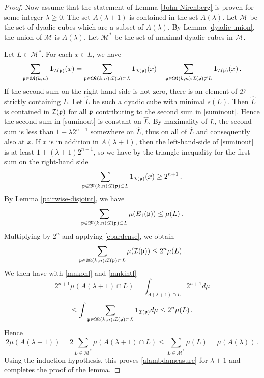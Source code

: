 {\begin{proof}
Now assume that the statement of Lemma \ref{John-Nirenberg}
is proven for some integer $\lambda\ge 0$.
The set $A(\lambda+1)$ is contained in the set $A(\lambda)$.
Let  $\mathcal{M}$ be the set of dyadic cubes which are a subset of $A(\lambda)$. By Lemma \ref{dyadic-union}, the union of $\mathcal{M}$ is $A(\lambda)$.
Let $\mathcal{M}^*$ be the set of maximal dyadic cubes in $\mathcal{M}$.

Let $L\in \mathcal{M}^*$. For each $x\in L$, we have
\begin{equation}\label{suminout}
 \sum_{{\mathfrak p} \in {\mathfrak{M}}(k,n)} \mathbf{1}_{{\mathcal{I}}({\mathfrak p})}(x)=
   \sum_{{\mathfrak p} \in {\mathfrak{M}}(k,n):{\mathcal{I}}({\mathfrak p}) \subset L} \mathbf{1}_{{\mathcal{I}}({\mathfrak p})}(x)+
  \sum_{{\mathfrak p} \in {\mathfrak{M}}(k,n):{\mathcal{I}}({\mathfrak p}) \not \subset L} \mathbf{1}_{{\mathcal{I}}({\mathfrak p})}(x)\, .
\end{equation}
If the second sum on the right-hand-side is not zero, there is
an element of $\mathcal{D}$  strictly containing $L$.
Let $\hat{L}$ be such a dyadic cube with minimal $s(L)$. Then $\hat{L}$ is contained in ${\mathcal{I}}({\mathfrak p})$ for all ${\mathfrak p}$
contributing to the second sum in
\eqref{suminout}.
Hence the second sum in \eqref{suminout} is constant on
$\hat{L}$.
By maximality of $L$, the second sum is less than  $1+\lambda 2^{n+1}$ somewhere on $\hat{L}$, thus on all of $\hat{L}$ and consequently also
at $x$.
If $x$ is in addition in $A(\lambda+1)$, then
the left-hand-side of \eqref{suminout} is at least
$1+(\lambda+1) 2^{n+1}$, so we have by the triangle inequality for the first sum on the right-hand side
\begin{equation}\label{mnkonl}
\sum_{{\mathfrak p} \in {\mathfrak{M}}(k,n):{\mathcal{I}}({\mathfrak p}) \subset L} \mathbf{1}_{{\mathcal{I}}({\mathfrak p})}(x)\ge 2^{n+1}\, .\end{equation}
By Lemma \ref{pairwise-disjoint}, we have
\begin{equation}
\sum_{{\mathfrak p} \in {\mathfrak{M}}(k,n):{\mathcal{I}}({\mathfrak p}) \subset L} \mu({E_1}({\mathfrak p})) \leq \mu(L)\, .
\end{equation}
Multiplying by $2^n$ and applying  \eqref{ebardense}, we obtain
\begin{equation}\label{mnkintl}
    \sum_{{\mathfrak p} \in {\mathfrak{M}}(k,n):{\mathcal{I}}({\mathfrak p}) \subset L} \mu({\mathcal{I}}({\mathfrak p}))  \leq 2^n \mu(L)\, .
\end{equation}
We then have with \eqref{mnkonl} and \eqref{mnkintl}
\begin{equation}
2^{n+1}\mu(A(\lambda+1)\cap L) =
 \int_{A(\lambda+1)\cap L} 2^{n+1} d\mu
\end{equation}
\begin{equation}
\le
    \int \sum_{{\mathfrak p} \in {\mathfrak{M}}(k,n):{\mathcal{I}}({\mathfrak p}) \subset L} \mathbf{1}_{{\mathcal{I}}({\mathfrak p})} d\mu
\le 2^n \mu(L)\, .
\end{equation}
Hence
\begin{equation}
    2\mu(A(\lambda+1))=2\sum_{L\in \mathcal{M}^*}
\mu(A(\lambda+1)\cap L)\le
\sum_{L\in \mathcal{M}^*}\mu( L)= \mu(A(\lambda))\, .
\end{equation}
Using the induction hypothesis, this proves
\eqref{alambdameasure} for $\lambda+1$ and completes the proof of the lemma.
\end{proof}

}

